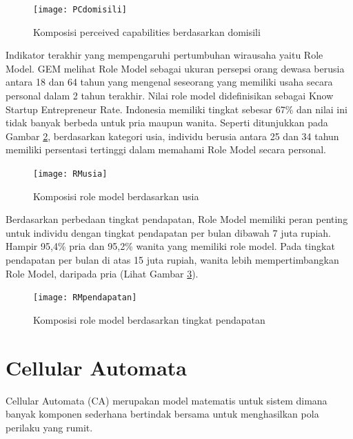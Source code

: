 \begin{figure} [H]
	\centering  
	\texttt{[image: PCdomisili]} 
	\caption[Komposisi perceived capabilities berdasarkan domisili]{Komposisi perceived capabilities berdasarkan domisili} 
	\label{fig:PCdomisili} 
\end{figure}

Indikator terakhir yang mempengaruhi pertumbuhan wirausaha yaitu Role Model. GEM melihat Role Model sebagai ukuran persepsi orang dewasa berusia antara 18 dan 64 tahun yang mengenal seseorang yang memiliki usaha secara personal dalam 2 tahun terakhir. Nilai role model didefinisikan sebagai Know Startup Entrepreneur Rate. Indonesia memiliki tingkat sebesar 67\% dan nilai ini tidak banyak berbeda untuk pria maupun wanita. Seperti ditunjukkan pada Gambar \ref{fig:RMusia}, berdasarkan kategori usia, individu berusia antara 25 dan 34 tahun memiliki persentasi tertinggi dalam memahami Role Model secara personal.


\begin{figure} [H]
	\centering  
	\texttt{[image: RMusia]} 
	\caption[Komposisi role model berdasarkan usia]{Komposisi role model berdasarkan usia} 
	\label{fig:RMusia} 
\end{figure}

Berdasarkan perbedaan tingkat pendapatan, Role Model memiliki peran penting untuk individu dengan tingkat pendapatan per bulan dibawah 7 juta rupiah. Hampir 95,4\% pria dan 95,2\% wanita yang memiliki role model. Pada tingkat pendapatan per bulan di atas 15 juta rupiah, wanita lebih mempertimbangkan Role Model, daripada pria (Lihat Gambar \ref{fig:RMpendapatan}).

\begin{figure} [H]
	\centering  
	\texttt{[image: RMpendapatan]} 
	\caption[Komposisi role model berdasarkan tingkat pendapatan]{Komposisi role model berdasarkan tingkat pendapatan} 
	\label{fig:RMpendapatan} 
\end{figure}


\section{Cellular Automata}
\label{sec:cellularautomata}

Cellular Automata (CA) merupakan model matematis untuk sistem dimana banyak komponen sederhana bertindak bersama untuk menghasilkan pola perilaku yang rumit.

